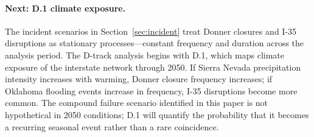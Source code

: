 \paragraph{Next: D.1 climate exposure.} The incident scenarios in Section~\ref{sec:incident} treat Donner closures and I-35 disruptions as stationary processes---constant frequency and duration across the analysis period. The D-track analysis begins with D.1, which maps climate exposure of the interstate network through 2050. If Sierra Nevada precipitation intensity increases with warming, Donner closure frequency increases; if Oklahoma flooding events increase in frequency, I-35 disruptions become more common. The compound failure scenario identified in this paper is not hypothetical in 2050 conditions; D.1 will quantify the probability that it becomes a recurring seasonal event rather than a rare coincidence.
